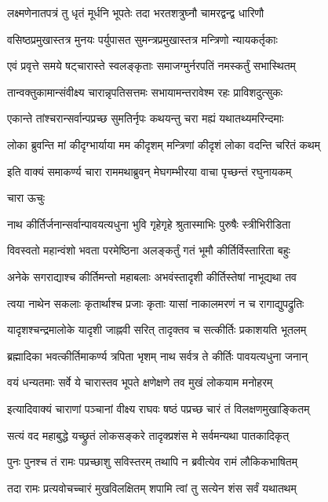 \twolineshloka
{लक्ष्मणेनातपत्रं तु धृतं मूर्धनि भूपतेः}
{तदा भरतशत्रुघ्नौ चामरद्वन्द्व धारिणौ}%

\twolineshloka
{वसिष्ठप्रमुखास्तत्र मुनयः पर्युपासत}
{सुमन्त्रप्रमुखास्तत्र मन्त्रिणो न्यायकर्तृकाः}%

\twolineshloka
{एवं प्रवृत्ते समये षट्चारास्ते स्वलङ्कृताः}
{समाजग्मुर्नरपतिं नमस्कर्तुं सभास्थितम्}%

\twolineshloka
{तान्वक्तुकामान्संवीक्ष्य चारान्नृपतिसत्तमः}
{सभायामन्तरावेश्म रहः प्राविशदुत्सुकः}%

\twolineshloka
{एकान्ते तांश्चरान्सर्वान्पप्रच्छ सुमतिर्नृपः}
{कथयन्तु चरा मह्यं यथातथ्यमरिन्दमाः}%

\twolineshloka
{लोका ब्रुवन्ति मां कीदृग्भार्याया मम कीदृशम्}
{मन्त्रिणां कीदृशं लोका वदन्ति चरितं कथम्}%

\twolineshloka
{इति वाक्यं समाकर्ण्य चारा राममथाब्रुवन्}
{मेघगम्भीरया वाचा पृच्छन्तं रघुनायकम्}%

चारा ऊचुः

\twolineshloka
{नाथ कीर्तिर्जनान्सर्वान्पावयत्यधुना भुवि}
{गृहेगृहे श्रुतास्माभिः पुरुषैः स्त्रीभिरीडिता}%

\twolineshloka
{विवस्वतो महान्वंशो भवता परमेष्ठिना}
{अलङ्कर्तुं गतं भूमौ कीर्तिर्विस्तारिता बहुः}%

\twolineshloka
{अनेके सगराद्याश्च कीर्तिमन्तो महाबलाः}
{अभवंस्तादृशी कीर्तिस्तेषां नाभूद्यथा तव}%

\twolineshloka
{त्वया नाथेन सकलाः कृतार्थाश्च प्रजाः कृताः}
{यासां नाकालमरणं न च रागाद्युपद्रुतिः}%

\twolineshloka
{यादृशश्चन्द्रमालोके यादृशी जाह्नवी सरित्}
{तादृक्तव च सत्कीर्तिः प्रकाशयति भूतलम्}%

\twolineshloka
{ब्रह्मादिका भवत्कीर्तिमाकर्ण्य त्रपिता भृशम्}
{नाथ सर्वत्र ते कीर्तिः पावयत्यधुना जनान्}%

\twolineshloka
{वयं धन्यतमाः सर्वे ये चारास्तव भूपते}
{क्षणेक्षणे तव मुखं लोकयाम मनोहरम्}%

\twolineshloka
{इत्यादिवाक्यं चाराणां पञ्चानां वीक्ष्य राघवः}
{षष्ठं पप्रच्छ चारं तं विलक्षणमुखाङ्कितम्}%


\twolineshloka
{सत्यं वद महाबुद्धे यच्छ्रुतं लोकसङ्करे}
{तादृक्प्रशंस मे सर्वमन्यथा पातकादिकृत्}%

\twolineshloka
{पुनः पुनश्च तं रामः पप्रच्छाशु सविस्तरम्}
{तथापि न ब्रवीत्येव रामं लौकिकभाषितम्}%

\twolineshloka
{तदा रामः प्रत्यवोचच्चारं मुखविलक्षितम्}
{शपामि त्वां तु सत्येन शंस सर्वं यथातथम्}%

